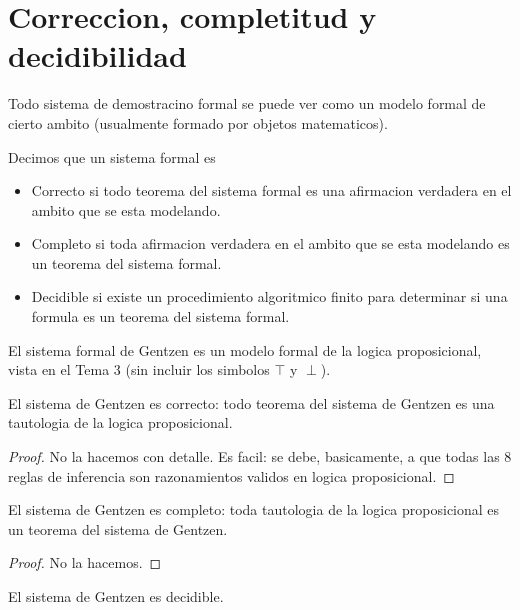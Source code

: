 \vspace{0.7cm}
\section{Correccion, completitud y decidibilidad}

\begin{definition}
	Todo sistema de demostracino formal se puede ver como un modelo formal de cierto ambito (usualmente formado por objetos matematicos).

	Decimos que un sistema formal es
	\begin{itemize}
		\item Correcto si todo teorema del sistema formal es una afirmacion verdadera en el ambito que se esta modelando.
		\item Completo si toda afirmacion verdadera en el ambito que se esta modelando es un teorema del sistema formal.
		\item Decidible si existe un procedimiento algoritmico finito para determinar si una formula es un teorema del sistema formal.
	\end{itemize}
\end{definition}
\begin{example}
	El sistema formal de Gentzen es un modelo formal de la logica proposicional, vista en el Tema 3 (sin incluir los simbolos \(\top\) y \(\perp \)).
\end{example}

\begin{theorem}
	El sistema de Gentzen es correcto: todo teorema del sistema de Gentzen es una tautologia de la logica proposicional.
\end{theorem}
\begin{proof}
	No la hacemos con detalle. Es facil: se debe, basicamente, a que todas las 8 reglas de inferencia son razonamientos validos en logica proposicional.
\end{proof}
\begin{theorem}
	El sistema de Gentzen es completo: toda tautologia de la logica proposicional es un teorema del sistema de Gentzen.
\end{theorem}
\begin{proof}
	No la hacemos.
\end{proof}

\begin{theorem}
	El sistema de Gentzen es decidible.
\end{theorem}

